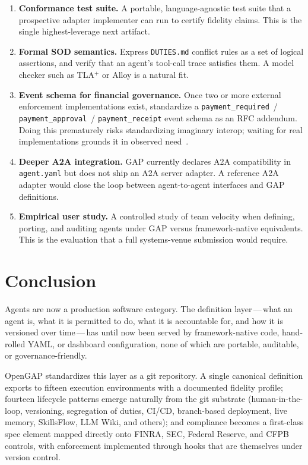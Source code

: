\documentclass[11pt,a4paper]{article}
\begin{document}
\begin{enumerate}
  \item \textbf{Conformance test suite.} A portable, language-agnostic test suite that
  a prospective adapter implementer can run to certify fidelity claims. This is the
  single highest-leverage next artifact.
  \item \textbf{Formal SOD semantics.} Express \texttt{DUTIES.md} conflict rules as a
  set of logical assertions, and verify that an agent's tool-call trace satisfies
  them. A model checker such as TLA$^+$ or Alloy is a natural fit.
  \item \textbf{Event schema for financial governance.} Once two or more external
  enforcement implementations exist, standardize a \texttt{payment\_required}~/
  \texttt{payment\_approval}~/ \texttt{payment\_receipt} event schema as an RFC
  addendum. Doing this prematurely risks standardizing imaginary interop; waiting
  for real implementations grounds it in observed need~\cite{rfc_38}.
  \item \textbf{Deeper A2A integration.} GAP currently declares A2A compatibility in
  \texttt{agent.yaml} but does not ship an A2A server adapter. A reference A2A
  adapter would close the loop between agent-to-agent interfaces and GAP definitions.
  \item \textbf{Empirical user study.} A controlled study of team velocity when
  defining, porting, and auditing agents under GAP versus framework-native
  equivalents. This is the evaluation that a full systems-venue submission would
  require.
\end{enumerate}

\section{Conclusion}\label{sec:conclusion}

Agents are now a production software category. The definition layer\,---\,what an
agent is, what it is permitted to do, what it is accountable for, and how it is
versioned over time\,---\,has until now been served by framework-native code,
hand-rolled YAML, or dashboard configuration, none of which are portable, auditable,
or governance-friendly.

OpenGAP standardizes this layer as a git repository. A single canonical definition
exports to fifteen execution environments with a documented fidelity profile; fourteen
lifecycle patterns emerge naturally from the git substrate (human-in-the-loop,
versioning, segregation of duties, CI/CD, branch-based deployment, live memory,
SkillsFlow, LLM Wiki, and others); and compliance becomes a first-class spec element
mapped directly onto FINRA, SEC, Federal Reserve, and CFPB controls, with enforcement
implemented through hooks that are themselves under version control.
\end{document}
